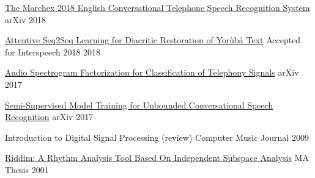 
\begin{cvhonors}

  \cvhonor
    {\href{https://arxiv.org/abs/1811.02058}{The Marchex 2018 English Conversational Telephone Speech Recognition System}} %
    {arXiv} %
    {} %
    {2018} %

  \cvhonor
    {\href{https://arxiv.org/abs/1804.00832}{Attentive Seq2Seq Learning for Diacritic Restoration of Yor{\`u}b{\'a} Text}} %
    {Accepted for Interspeech 2018} %
    {} %
    {2018} %

  \cvhonor
    {\href{https://arxiv.org/abs/1811.04139}{Audio Spectrogram Factorization for Classification of Telephony Signals}} %
    {arXiv} %
    {} %
    {2017} %

  \cvhonor
    {\href{https://arxiv.org/abs/1705.09724}{Semi-Supervised Model Training for Unbounded Conversational Speech Recognition}} %
    {arXiv} %
    {} %
    {2017} %


  \cvhonor
    {Introduction to Digital Signal Processing (review)} %
    {Computer Music Journal} %
    {} %
    {2009} %
        
  \cvhonor
    {\href{https://arxiv.org/abs/1705.04792}{Riddim: A Rhythm Analysis Tool Based On Independent Subspace Analysis}} %
    {MA Thesis} %
    {} %
    {2001} %
    
\end{cvhonors}
